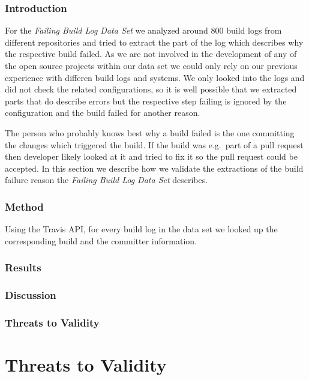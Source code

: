 \documentclass[\myrootdir/main.tex]{subfiles}
\begin{document}
\subsubsection{Introduction}
For the \emph{Failing Build Log Data Set} we analyzed around 800 build logs from different repositories and tried to extract the part of the log which describes why the respective build failed.
As we are not involved in the development of any of the open source projects within our data set we could only rely on our previous experience with differen build logs and systems.
We only looked into the logs and did not check the related configurations, so it is well possible that we extracted parts that do describe errors but the respective step failing is ignored by the configuration and the build failed for another reason.

The person who probably knows best why a build failed is the one committing the changes which triggered the build.
If the build was e.g.\ part of a pull request then developer likely looked at it and tried to fix it so the pull request could be accepted.
In this section we describe how we validate the extractions of the build failure reason the \emph{Failing Build Log Data Set} describes.
\subsubsection{Method}
Using the Travis API, for every build log in the data set we looked up the corresponding build and the committer information. 
\subsubsection{Results}
\subsubsection{Discussion}
\subsubsection{Threats to Validity}

\section{Threats to Validity}
\end{document}
